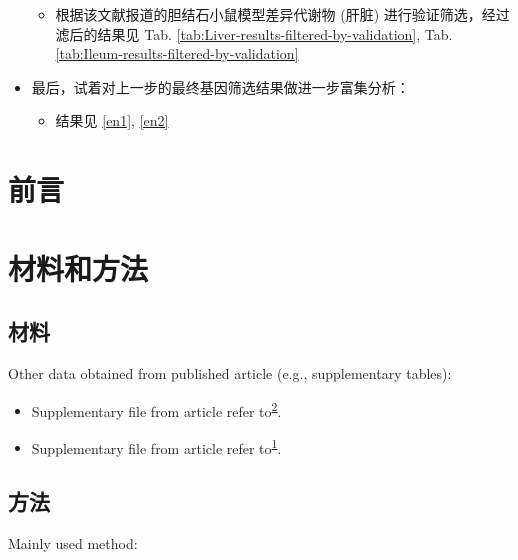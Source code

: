 \documentclass[
]{article}
\providecommand{\tightlist}{%
  \setlength{\itemsep}{0pt}\setlength{\parskip}{0pt}}
\begin{document}
\begin{itemize}
  \begin{itemize}
  \tightlist
  \item
    根据该文献报道的胆结石小鼠模型差异代谢物 (肝脏) 进行验证筛选，经过滤后的结果见 Tab. \ref{tab:Liver-results-filtered-by-validation}, Tab. \ref{tab:Ileum-results-filtered-by-validation}
  \end{itemize}
\item
  最后，试着对上一步的最终基因筛选结果做进一步富集分析：

  \begin{itemize}
  \tightlist
  \item
    结果见 \ref{en1}, \ref{en2}
  \end{itemize}
\end{itemize}

\hypertarget{introduction}{%
\section{前言}\label{introduction}}

\hypertarget{methods}{%
\section{材料和方法}\label{methods}}

\hypertarget{ux6750ux6599}{%
\subsection{材料}\label{ux6750ux6599}}

Other data obtained from published article (e.g., supplementary tables):

\begin{itemize}
\tightlist
\item
  Supplementary file from article refer to\textsuperscript{\protect\hyperlink{ref-ChangesAndCorChen2021}{2}}.
\item
  Supplementary file from article refer to\textsuperscript{\protect\hyperlink{ref-ProteinMetabolBenson2023}{1}}.
\end{itemize}

\hypertarget{ux65b9ux6cd5}{%
\subsection{方法}\label{ux65b9ux6cd5}}

Mainly used method:
\end{document}
